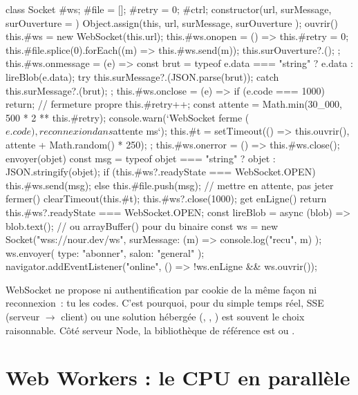 \begin{codejs}
class Socket {
  #ws; #file = []; #retry = 0; #ctrl;
  constructor(url, { surMessage, surOuverture } = {}) {
    Object.assign(this, { url, surMessage, surOuverture });
  }
  ouvrir() {
    this.#ws = new WebSocket(this.url);
    this.#ws.onopen = () => {
      this.#retry = 0;
      this.#file.splice(0).forEach((m) => this.#ws.send(m));
      this.surOuverture?.();
    };
    this.#ws.onmessage = (e) => {
      const brut = typeof e.data === "string" ? e.data : lireBlob(e.data);
      try { this.surMessage?.(JSON.parse(brut)); }
      catch { this.surMessage?.(brut); }
    };
    this.#ws.onclose = (e) => {
      if (e.code === 1000) return;                       // fermeture propre
      this.#retry++;
      const attente = Math.min(30_000, 500 * 2 ** this.#retry);
      console.warn(`WebSocket ferme (${e.code}), reconnexion dans ${attente} ms`);
      this.#t = setTimeout(() => this.ouvrir(), attente + Math.random() * 250);
    };
    this.#ws.onerror = () => this.#ws.close();
  }
  envoyer(objet) {
    const msg = typeof objet === "string" ? objet : JSON.stringify(objet);
    if (this.#ws?.readyState === WebSocket.OPEN) this.#ws.send(msg);
    else this.#file.push(msg);                            // mettre en attente, pas jeter
  }
  fermer() { clearTimeout(this.#t); this.#ws?.close(1000); }
  get enLigne() { return this.#ws?.readyState === WebSocket.OPEN; }
}
const lireBlob = async (blob) => blob.text();   // ou arrayBuffer() pour du binaire
const ws = new Socket("wss://nour.dev/ws", { surMessage: (m) => console.log("recu", m) });
ws.envoyer({ type: "abonner", salon: "general" });
navigator.addEventListener("online", () => !ws.enLigne && ws.ouvrir());
\end{codejs}

\begin{note}
WebSocket ne propose ni authentification par cookie de la m\^eme fa\c{c}on ni reconnexion~: tu les
codes. C'est pourquoi, pour du simple temps r\'eel, SSE (serveur $\rightarrow$ client) ou une
solution h\'eberg\'ee (, ,
) est souvent le choix raisonnable.
C\^ot\'e serveur Node, la biblioth\`eque de r\'ef\'erence est
 ou .
\end{note}

\section{Web Workers : le CPU en parall\`ele}
\label{sec-workers}

